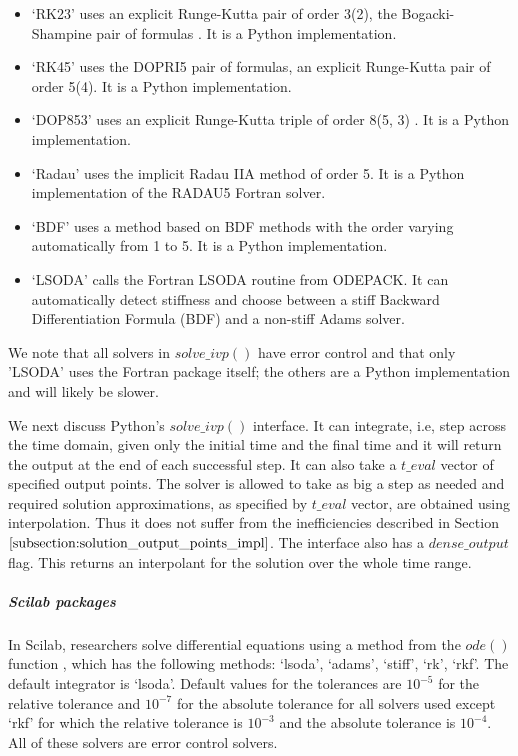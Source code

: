 \begin{itemize}
\item `RK23' uses an explicit Runge-Kutta pair of order 3(2), the Bogacki-Shampine pair of formulas \cite{MR1025845}. It is a Python implementation.

\item `RK45' uses the DOPRI5 pair of formulas, an explicit Runge-Kutta pair of order 5(4). It is a Python implementation.

\item `DOP853' uses an explicit Runge-Kutta triple of order 8(5, 3) \cite{hairerWebsite}. It is a Python implementation.

\item `Radau' uses the implicit Radau IIA method of order 5. It is a Python implementation of the RADAU5 Fortran solver.

\item `BDF' uses a method based on BDF methods with the order varying automatically from 1 to 5. It is a Python implementation.

\item `LSODA' calls the Fortran LSODA routine from ODEPACK. It can automatically detect stiffness and choose between a stiff Backward Differentiation Formula (BDF) and a non-stiff Adams solver.
\end{itemize}

We note that all solvers in $solve\_ivp()$ have error control and that only 'LSODA' uses the Fortran package itself; the others are a Python implementation and will likely be slower.

We next discuss Python's $solve\_ivp()$ interface. It can integrate, i.e, step across the time domain, given only the initial time and the final time and it will return the output at the end of each successful step. It can also take a $t\_eval$ vector of specified output points. The solver is allowed to take as big a step as needed and required solution approximations, as specified by $t\_eval$ vector, are obtained using interpolation. Thus it does not suffer from the inefficiencies described in Section $\ref{subsection:solution_output_points_impl}$. The interface also has a $dense\_output$ flag. This returns an interpolant for the solution over the whole time range.

\subparagraph{Scilab packages}
In Scilab, researchers solve differential equations using a method from the $ode()$ function \cite{campbell2010modeling}, which has the following methods: `lsoda', `adams', `stiff', `rk', `rkf'. The default integrator is `lsoda'.
Default values for the tolerances are $10^{-5}$ for the relative tolerance and $10^{-7}$ for the absolute tolerance for all solvers used except `rkf' for which the relative tolerance is $10^{-3}$ and the absolute tolerance is $10^{-4}$. All of these solvers are error control solvers.


